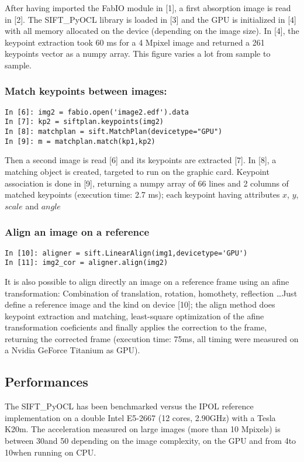 \documentclass[preprint]{iucr}
\begin{document}
After having imported the FabIO \cite{fabio} module in [1], a first
absorption image is read in [2]. The SIFT\_PyOCL library is loaded in [3] and the
GPU is initialized in [4] with all memory allocated on the device (depending on
the image size).
In [4], the keypoint extraction took 60 ms for a
4 Mpixel image and returned a 261 keypoints vector as a numpy array. 
This figure varies a lot from sample to sample.

\subsubsection{Match keypoints between images:}
\begin{verbatim}
In [6]: img2 = fabio.open('image2.edf').data
In [7]: kp2 = siftplan.keypoints(img2)
In [8]: matchplan = sift.MatchPlan(devicetype="GPU")
In [9]: m = matchplan.match(kp1,kp2)
\end{verbatim}
Then a second image is read [6] and its keypoints are extracted [7].
In [8], a matching object is created, targeted to run on the graphic card.  
Keypoint association is done in [9], returning a numpy array of 66 lines and 2
columns of matched keypoints (execution time: 2.7 ms); each keypoint having
attributes $x$, $y$, $scale$ and $angle$

\subsubsection{Align an image on a reference}
\begin{verbatim}
In [10]: aligner = sift.LinearAlign(img1,devicetype='GPU')
In [11]: img2_cor = aligner.align(img2)
\end{verbatim}
It is also possible to align directly an image on a reference frame using an
afine transformation: Combination of translation, rotation, homothety,
reflection \ldots Just define a reference image and the kind on device [10]; the
align method does keypoint extraction and matching, least-square optimization
of the afine transformation coeficients and finally applies the correction to
the frame, returning the corrected frame (execution time: 75ms, all timing were
measured on a Nvidia GeForce Titanium as GPU).

\subsection{Performances}

The SIFT\_PyOCL has been benchmarked versus the IPOL reference implementation on
a double Intel E5-2667 (12 cores, 2.90GHz) with a Tesla K20m. The acceleration
measured on large images (more than 10 Mpixels) is between 30\times and 50\times
depending on the image complexity, on the GPU and from 4\times to 10\times when
running on CPU.
\end{document}
